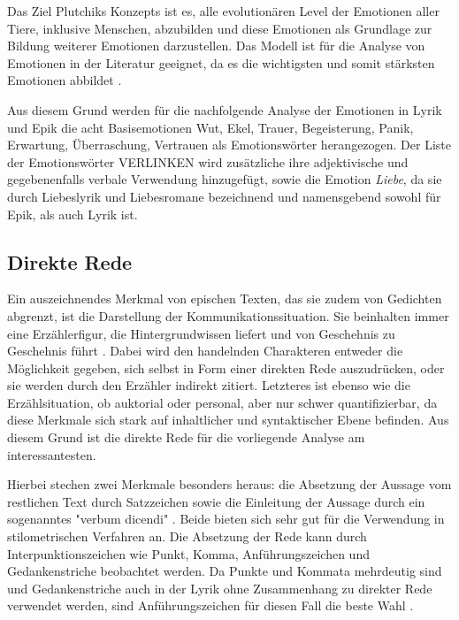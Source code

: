 \documentclass[a4paper,10p]{article}
\begin{document}
Das Ziel Plutchiks Konzepts ist es, alle evolutionären Level der Emotionen aller Tiere, inklusive Menschen, abzubilden und diese Emotionen als Grundlage zur Bildung weiterer Emotionen darzustellen. Das Modell ist für die Analyse von Emotionen in der Literatur geeignet, da es die wichtigsten und somit stärksten Emotionen abbildet \citep[vgl.][S. 40-122]{Plutchik}. \par 

Aus diesem Grund werden für die nachfolgende Analyse der Emotionen in Lyrik und Epik die acht Basisemotionen Wut, Ekel, Trauer, Begeisterung, Panik, Erwartung, Überraschung, Vertrauen als Emotionswörter herangezogen. Der Liste der Emotionswörter VERLINKEN wird zusätzliche ihre adjektivische und gegebenenfalls verbale Verwendung hinzugefügt, sowie die Emotion \textit{Liebe}, da sie durch Liebeslyrik und Liebesromane bezeichnend und namensgebend sowohl für Epik, als auch Lyrik ist. 
 

\subsection{Direkte Rede}
Ein auszeichnendes Merkmal von epischen Texten, das sie zudem von Gedichten abgrenzt, ist die Darstellung der Kommunikationssituation. Sie beinhalten immer eine Erzählerfigur, die Hintergrundwissen liefert und von Geschehnis zu Geschehnis führt \citep[vgl.][S. 9]{Bloss2005}. Dabei wird den handelnden Charakteren entweder die Möglichkeit gegeben, sich selbst in Form einer direkten Rede auszudrücken, oder sie werden durch den Erzähler indirekt zitiert. Letzteres ist ebenso wie die Erzählsituation, ob auktorial oder personal, aber nur schwer quantifizierbar, da diese Merkmale sich stark auf inhaltlicher und syntaktischer Ebene befinden. Aus diesem Grund ist die direkte Rede für die vorliegende Analyse am interessantesten.\par 

Hierbei stechen zwei Merkmale besonders heraus: die Absetzung der Aussage vom restlichen Text durch Satzzeichen sowie die Einleitung der Aussage durch ein sogenanntes "verbum dicendi" \citep[S. 6]{Bloss2005}. Beide bieten sich sehr gut für die Verwendung in stilometrischen Verfahren an. Die Absetzung der Rede kann durch Interpunktionszeichen wie Punkt, Komma, Anführungszeichen und Gedankenstriche beobachtet werden. Da Punkte und Kommata mehrdeutig sind und Gedankenstriche auch in der Lyrik ohne Zusammenhang zu direkter Rede verwendet werden, sind Anführungszeichen für diesen Fall die beste Wahl \citep[vgl.][S. 34]{Bloss2005}.\par 
\end{document}
